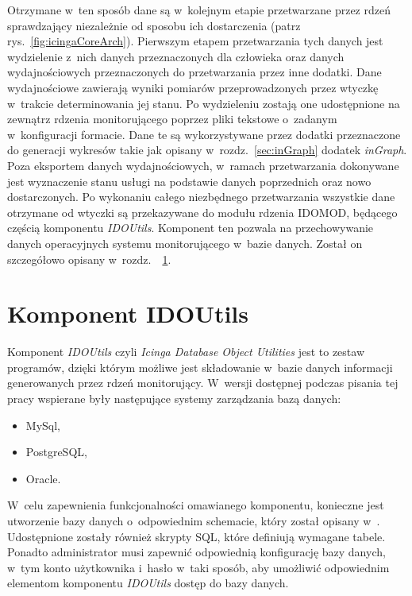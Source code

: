 Otrzymane w~ten sposób dane są w~kolejnym etapie przetwarzane przez
rdzeń sprawdzający niezależnie od sposobu ich dostarczenia (patrz
rys.~\ref{fig:icingaCoreArch}). Pierwszym etapem przetwarzania tych
danych jest wydzielenie z~nich danych przeznaczonych dla człowieka
oraz danych wydajnościowych przeznaczonych do przetwarzania przez inne
dodatki. Dane wydajnościowe zawierają wyniki pomiarów przeprowadzonych
przez wtyczkę w~trakcie determinowania jej stanu. Po wydzieleniu
zostają one udostępnione na zewnątrz rdzenia monitorującego poprzez
pliki tekstowe o~zadanym w~konfiguracji formacie. Dane te są
wykorzystywane przez dodatki przeznaczone do generacji wykresów takie
jak opisany w~rozdz.~\ref{sec:inGraph} dodatek {\em inGraph}. Poza eksportem
danych wydajnościowych, w~ramach przetwarzania dokonywane jest
wyznaczenie stanu usługi na podstawie danych poprzednich oraz nowo
dostarczonych. Po wykonaniu całego niezbędnego przetwarzania wszystkie
dane otrzymane od wtyczki są przekazywane do modułu rdzenia IDOMOD,
będącego częścią komponentu {\em IDOUtils}. Komponent ten pozwala na
przechowywanie danych operacyjnych systemu monitorującego w~bazie
danych. Został on szczegółowo opisany w~rozdz.~~\ref{sec:IDOUtils}.

\section[Komponent IDOUtils][Komponent IDOUtils]{Komponent IDOUtils}
\label{sec:IDOUtils}

Komponent {\em IDOUtils} czyli {\em Icinga Database Object Utilities} jest
to zestaw programów, dzięki którym możliwe jest składowanie w~bazie
danych informacji generowanych przez rdzeń monitorujący. W~wersji
dostępnej podczas pisania tej pracy wspierane były następujące systemy
zarządzania bazą danych:

\begin{itemize}
\item MySql,
\item PostgreSQL,
\item Oracle.
\end{itemize}

W~celu zapewnienia funkcjonalności omawianego komponentu, konieczne
jest utworzenie bazy danych o~odpowiednim schemacie, który został
opisany w~\cite[669-750]{www:IcingaDoc}. Udostępnione zostały również
skrypty SQL, które definiują wymagane tabele. Ponadto administrator
musi zapewnić odpowiednią konfigurację bazy danych, w~tym konto
użytkownika i~hasło w~taki sposób, aby umożliwić odpowiednim
elementom komponentu {\em IDOUtils} dostęp do bazy danych.

